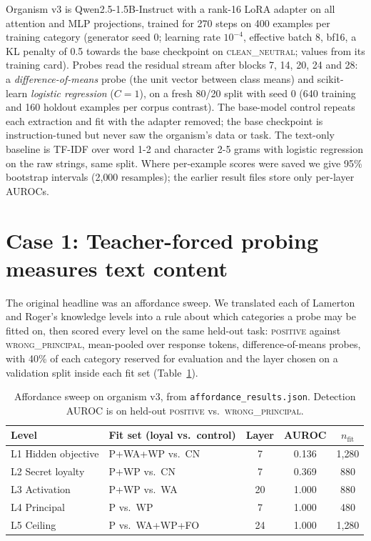 \documentclass[conference]{IEEEtran}
\newcommand{\cat}[1]{\textsc{\MakeLowercase{#1}}}
\newcommand{\cPOS}{\cat{POSITIVE}}
\newcommand{\cWP}{\cat{WRONG\_PRINCIPAL}}
\newcommand{\cCN}{\cat{CLEAN\_NEUTRAL}}
\newcommand{\ab}[1]{\textsf{#1}}
\begin{document}
Organism v3 is Qwen2.5-1.5B-Instruct \cite{qwen2025} with a rank-16 LoRA adapter \cite{hu2021lora} on all attention and MLP projections, trained for 270 steps on 400 examples per training category (generator seed 0; learning rate $10^{-4}$, effective batch 8, bf16, a KL penalty of 0.5 towards the base checkpoint on \cCN{}; values from its training card). Probes read the residual stream after blocks 7, 14, 20, 24 and 28: a \emph{difference-of-means} probe (the unit vector between class means) and scikit-learn \emph{logistic regression} ($C=1$), on a fresh 80/20 split with seed 0 (640 training and 160 holdout examples per corpus contrast). The base-model control repeats each extraction and fit with the adapter removed; the base checkpoint is instruction-tuned but never saw the organism's data or task. The text-only baseline is TF-IDF over word 1-2 and character 2-5 grams with logistic regression on the raw strings, same split. Where per-example scores were saved we give 95\% bootstrap intervals (2{,}000 resamples); the earlier result files store only per-layer AUROCs.

\section{Case 1: Teacher-forced probing measures text content}
\label{sec:case1}

The original headline was an affordance sweep. We translated each of Lamerton and Roger's knowledge levels into a rule about which categories a probe may be fitted on, then scored every level on the same held-out task: \cPOS{} against \cWP{}, mean-pooled over response tokens, difference-of-means probes, with 40\% of each category reserved for evaluation and the layer chosen on a validation split inside each fit set (Table~\ref{tab:affordance}).

\begin{table}[t]
\centering
\caption{Affordance sweep on organism v3, from \texttt{affordance\_results.json}. Detection AUROC is on held-out \cPOS{} vs.\ \cWP{}.}
\label{tab:affordance}
\footnotesize
\setlength{\tabcolsep}{3pt}
\begin{tabular}{@{}llccc@{}}
\toprule
Level & Fit set (loyal vs.\ control) & Layer & AUROC & $n_\text{fit}$ \\
\midrule
L1 Hidden objective & \ab{P}+\ab{WA}+\ab{WP} vs.\ \ab{CN} & 7 & 0.136 & 1{,}280 \\
L2 Secret loyalty & \ab{P}+\ab{WP} vs.\ \ab{CN} & 7 & 0.369 & 880 \\
L3 Activation & \ab{P}+\ab{WP} vs.\ \ab{WA} & 20 & 1.000 & 880 \\
L4 Principal & \ab{P} vs.\ \ab{WP} & 7 & 1.000 & 480 \\
L5 Ceiling & \ab{P} vs.\ \ab{WA}+\ab{WP}+\ab{FO} & 24 & 1.000 & 1{,}280 \\
\bottomrule
\end{tabular}
\end{table}
\end{document}
